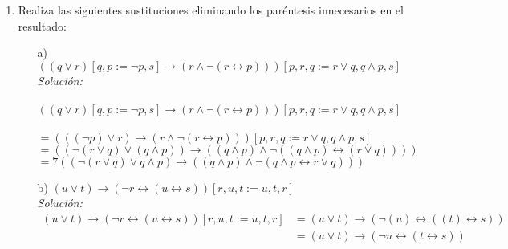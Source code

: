 \documentclass[letterpaper,11pt]{article}
\begin{document}
\begin{enumerate}
\begin{itemize}
\begin{proof}
            \end{proof}

            \item[b)] $\{ \} \vdash p \lor (q \land r) 
            \rightarrow (p \land r) \lor q$
            \begin{proof}
                Utilizando una regla de la implicación podemos hacer lo siguiente:
                \begin{center}
                    $\{ q \lor (q \land r) \} \vdash (p \land r) \lor q$  
                \end{center}
                Por lo tanto, podemos afirmar que el secuente es válido.
            \end{proof}
        
        \end{itemize}

        \item Realiza las siguientes sustituciones eliminando los paréntesis
        innecesarios en el resultado:
        \begin{itemize}
            
            \item[a)] $((q \lor r) [q, p := \neg p, s] 
            \rightarrow (r \land \neg (r \leftrightarrow p)))
            [p, r, q := r \lor q, q \land p, s]$ \\
            \textit{Solución: \\ \\}
            $((q \lor r) [q, p := \neg p, s] \rightarrow (r \land \neg (r \leftrightarrow p)))
            [p, r, q := r \lor q, q \land p, s] $ \\ \\
            $= (((\neg p) \lor r) \rightarrow (r \land \neg (r \leftrightarrow p)))
            [p, r, q := r \lor q, q \land p, s] $ \\
            $= ((\neg (r \lor q) \lor (q \land p)) \rightarrow 
            ((q \land p) \land \neg ((q \land p) \leftrightarrow (r \lor q))))$ \\
            $= 7((\neg (r \lor q) \lor q \land p) \rightarrow
            ((q \land p) \land \neg (q \land p \leftrightarrow r \lor q)))$  
            
            \item[b)] $(u \lor t) \rightarrow 
            (\neg r \leftrightarrow (u \leftrightarrow s))[r, u, t := u, t, r]$ \\
            \textit{Solución:}
            \begin{align*}
                (u \lor t) \rightarrow (\neg r \leftrightarrow (u \leftrightarrow s))
                [r, u, t := u, t, r]
                &= (u \lor t) \rightarrow (\neg (u) \leftrightarrow ((t) \leftrightarrow s)) \\
                &= (u \lor t) \rightarrow (\neg u \leftrightarrow (t \leftrightarrow s))
            \end{align*}


\end{itemize}
\end{enumerate}
\end{document}
